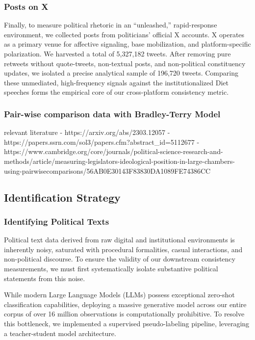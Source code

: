 \documentclass[11pt,letterpaper]{article}
\theoremstyle{plain}
\begin{document}
\subsubsection{Posts on X}
Finally, to measure political rhetoric in an ``unleashed,'' rapid-response environment, we collected posts from politicians' official X accounts. X operates as a primary venue for affective signaling, base mobilization, and platform-specific polarization. We harvested a total of 5,327,182 tweets. After removing pure retweets without quote-tweets, non-textual posts, and non-political constituency updates, we isolated a precise analytical sample of 196,720 tweets. Comparing these unmediated, high-frequency signals against the institutionalized Diet speeches forms the empirical core of our cross-platform consistency metric.

\subsubsection{Pair-wise comparison data with Bradley-Terry Model}

relevant literature
- https://arxiv.org/abs/2303.12057
- https://papers.ssrn.com/sol3/papers.cfm?abstract_id=5112677
- https://www.cambridge.org/core/journals/political-science-research-and-methods/article/measuring-legislators-ideological-position-in-large-chambers-using-pairwisecomparisons/56AB0E30143F83830DA1089FE74386CC    

\subsection{Identification Strategy}
\subsubsection{Identifying Political Texts}
Political text data derived from raw digital and institutional environments is inherently noisy, saturated with procedural formalities, casual interactions, and non-political discourse. To ensure the validity of our downstream consistency measurements, we must first systematically isolate substantive political statements from this noise. 

While modern Large Language Models (LLMs) possess exceptional zero-shot classification capabilities, deploying a massive generative model across our entire corpus of over 16 million observations is computationally prohibitive. To resolve this bottleneck, we implemented a supervised pseudo-labeling pipeline, leveraging a teacher-student model architecture.  
\end{document}
